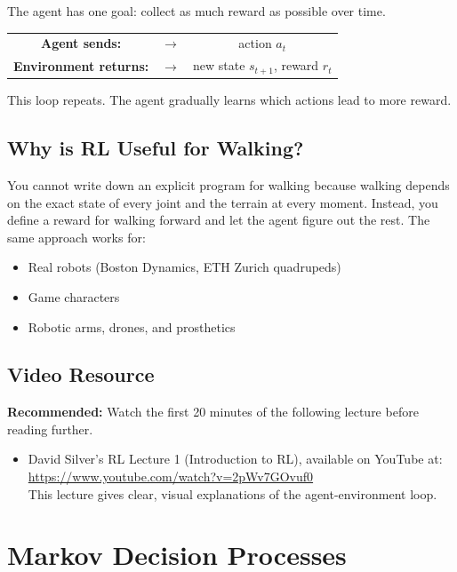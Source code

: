 \documentclass[12pt, a4paper]{article}
\begin{document}
The agent has one goal: collect as much reward as possible over time.

\medskip
\begin{center}
\begin{tabular}{ccc}
    \textbf{Agent sends:} & $\longrightarrow$ & action $a_t$ \\
    \textbf{Environment returns:} & $\longrightarrow$ & new state $s_{t+1}$, reward $r_t$
\end{tabular}
\end{center}
\medskip

This loop repeats. The agent gradually learns which actions lead to more reward.

\subsection{Why is RL Useful for Walking?}

You cannot write down an explicit program for walking because walking depends on the exact state of every joint and the terrain at every moment. Instead, you define a reward for walking forward and let the agent figure out the rest. The same approach works for:
\begin{itemize}
    \item Real robots (Boston Dynamics, ETH Zurich quadrupeds)
    \item Game characters
    \item Robotic arms, drones, and prosthetics
\end{itemize}

\subsection{Video Resource}

\textbf{Recommended:} Watch the first 20 minutes of the following lecture before reading further.

\begin{itemize}
    \item David Silver's RL Lecture 1 (Introduction to RL), available on YouTube at:\\
          \url{https://www.youtube.com/watch?v=2pWv7GOvuf0}\\
          This lecture gives clear, visual explanations of the agent-environment loop.
\end{itemize}

\section{Markov Decision Processes}
\end{document}
